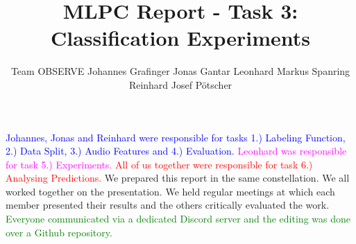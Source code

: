 \documentclass{article}
\title{MLPC Report  - Task 3: Classification Experiments}
\author{
  Team OBSERVE \AND
  Johannes Grafinger 
  \And
  Jonas Gantar 
  \And 
  Leonhard Markus Spanring 
  \And 
  Reinhard Josef Pötscher
}
\begin{document}
\maketitle

\begin{contributions}
  \textcolor{blue}{Johannes, Jonas and Reinhard were responsible for tasks 1.) Labeling Function, 2.) Data Split, 3.) Audio Features and 4.) Evaluation. } 
  \textcolor{magenta}{Leonhard was responsible for task 5.) Experiments. } 
  \textcolor{red}{All of us together were responsible for task 6.) Analysing Predictions. } 
  We prepared this report in the same constellation. We all worked together on the presentation. 
  We held regular meetings at which each member presented their results and the others critically evaluated the work. 
  \textcolor{green}{Everyone communicated via a dedicated Discord server and the editing was done over a Github repository. } 
\end{contributions}


\newpage


\newpage


\newpage


\newpage


\newpage


\end{document}
